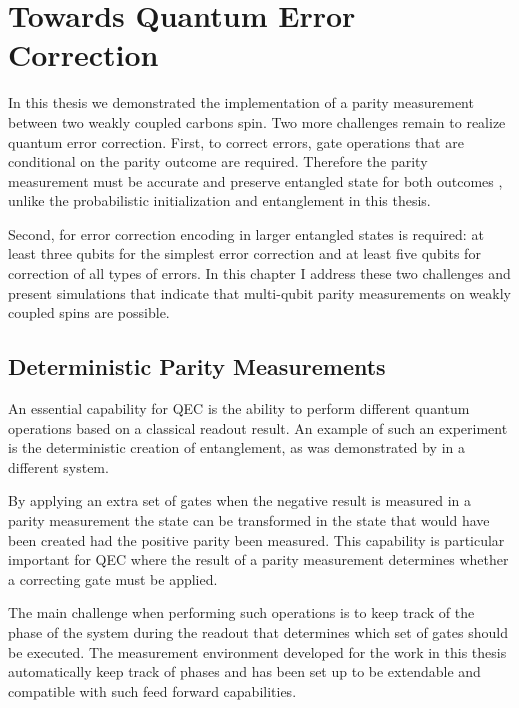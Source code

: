 \chapter{Towards Quantum Error Correction}
In this thesis we demonstrated the implementation of a parity measurement between two weakly coupled carbons spin.
Two more challenges remain to realize quantum error correction.
First, to correct errors, gate operations that are conditional on the parity outcome are required.
Therefore the parity measurement must be accurate and preserve entangled state for both outcomes \citep{Riste2013Deterministic}, unlike the probabilistic initialization and entanglement in this thesis.

Second, for error correction encoding in larger entangled states is required: at least three qubits for the simplest error correction and at least five qubits for correction of all types of errors.
In this chapter I address these two challenges and present simulations that indicate that multi-qubit parity measurements on weakly coupled spins are possible.

\section{Deterministic Parity Measurements}

An essential capability for QEC is the ability to perform different quantum operations based on a classical readout result.
An example of such an experiment is the deterministic creation of entanglement, as was demonstrated by \citet{Riste2013Deterministic} in a different system.

By applying an extra set of gates when the negative result is measured in a parity measurement the state can be transformed in the state that would have been created had the positive parity been measured.
This capability is particular important for QEC where the result of a parity measurement determines whether a correcting gate must be applied.

The main challenge when performing such operations is to keep track of the phase of the system during the readout that determines which set of gates should be executed.
The measurement environment developed for the work in this thesis automatically keep track of phases and has been set up to be extendable and compatible with such feed forward capabilities.



